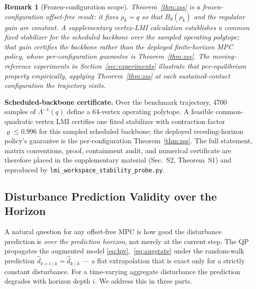 \documentclass[journal]{IEEEtran}
\newtheorem{remark}{Remark}
\newcommand{\dhat}{\hat{d}}
\begin{document}
\begin{remark}[Frozen-configuration scope]
Theorem~\ref{thm:zss} is a \emph{frozen-configuration} offset-free result:
it fixes $\rho_k=q$ so that $B_d(\rho_k)$ and the regulator gain are
constant. A supplementary vertex-LMI calculation establishes a common fixed
stabilizer for the scheduled backbone over the sampled operating polytope;
that gain certifies the backbone rather than the deployed finite-horizon
MPC policy, whose per-configuration guarantee is Theorem~\ref{thm:zss}. The
moving-reference experiments in Section~\ref{sec:experiments} illustrate
that per-equilibrium property empirically, applying Theorem~\ref{thm:zss}
at each sustained-contact configuration the trajectory visits.
\end{remark}

\textbf{Scheduled-backbone certificate.}
Over the benchmark trajectory, 4700 samples of $\Lambda^{-1}(q)$ define a
64-vertex operating polytope. A feasible common-quadratic vertex LMI certifies
one fixed stabilizer with contraction factor $\varrho\le0.996$ for this sampled
scheduled backbone; the deployed receding-horizon policy's guarantee is the
per-configuration Theorem~\ref{thm:zss}. The full statement, matrix conventions, proof, containment audit, and
numerical certificate are therefore placed in the supplementary material
(Sec.~S2, Theorem~S1) and reproduced by
\texttt{lmi\_workspace\_stability\_probe.py}.

\subsection{Disturbance Prediction Validity over the Horizon}

A natural question for any offset-free MPC is how good the disturbance
prediction is \emph{over the prediction horizon}, not merely at the current
step. The QP propagates the augmented model
\eqref{eq:lpv},~\eqref{eq:augstate} under the random-walk prediction
$\dhat_{k+i\mid k}=\dhat_{k\mid k}$ --- a flat extrapolation that is exact only
for a strictly constant disturbance. For a time-varying aggregate disturbance
the prediction degrades with horizon depth $i$. We address this in three parts.
\end{document}
